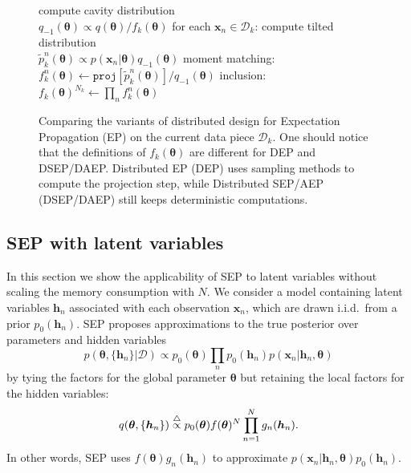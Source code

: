 \documentclass{article} %
\begin{document}
\begin{figure}[!t]
\begin{minipage}[t]{0.33\linewidth}
\begin{algorithm}[H]
\begin{algorithmic}[1]
	\STATE compute cavity distribution \\ $q_{-1}(\bm{\theta}) \propto q(\bm{\theta}) / f_k(\bm{\theta})$
	\STATE for each $\bm{x}_n \in \mathcal{D}_k$:
	\STATE \quad compute tilted distribution \\$\tilde{p}_k^n(\bm{\theta}) \propto p(\bm{x}_n|\bm{\theta}) q_{-1}(\bm{\theta})$
	\STATE \quad moment matching: \\\hspace{-1mm}$f_k^n(\bm{\theta}) \leftarrow \mathtt{proj}[\tilde{p}_k^n(\bm{\theta})] / q_{-1}(\bm{\theta}) $
	\STATE inclusion:\\ $f_k(\bm{\theta})^{N_k} \leftarrow \prod_n f_k^n(\bm{\theta})$
\end{algorithmic}
\end{algorithm}
\end{minipage} 
%
\caption{Comparing the variants of distributed design for Expectation Propagation (EP) on the current data piece $\mathcal{D}_k$. One should notice that the definitions of $f_k(\bm{\theta})$ are different for DEP and DSEP/DAEP. Distributed EP (DEP) uses sampling methods to compute the projection step, while Distributed SEP/AEP (DSEP/DAEP) still keeps deterministic computations.}
\end{figure}

\subsection{SEP with latent variables}
In this section we show the applicability of SEP to latent variables without scaling the memory consumption with $N$.
%
We consider a model containing latent variables $\bm{h}_n$ associated with each observation $\bm{x}_n$, which are drawn i.i.d.~from a prior $p_0(\bm{h}_n)$. SEP proposes approximations to the true posterior over parameters and hidden variables 
\begin{equation}
p(\bm{\theta}, \{ \bm{h}_n\} | \mathcal{D}) \propto p_0(\bm{\theta}) \prod_n p_0(\bm{h}_n) p(\bm{x}_n | \bm{h}_n, \bm{\theta})
\end{equation}
by tying the factors for the global parameter $\bm{\theta}$ but retaining the local factors for the hidden variables:
%
\begin{equation}
q(\bm{\theta}, \{ \bm{h}_n\}) \buildrel\triangle\over \propto p_0(\bm{\theta}) f(\bm{\theta})^N \prod_{n=1}^N g_n(\bm{h}_n) .
\end{equation}
In other words, SEP uses $f(\bm{\theta}) g_n(\bm{h}_n)$ to approximate $p(\bm{x}_n | \bm{h}_n, \bm{\theta})p_0(\bm{h}_n)$.
\end{document}
